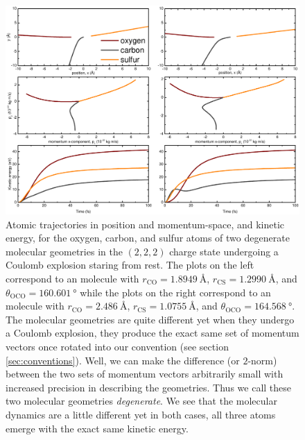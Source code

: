\begin{figure}
  \centering
  \includegraphics[width=\textwidth]{Plots/DegenerateGeometryTrajectories.pdf}
  \caption[Atomic trajectories in position and momentum-space, and kinetic energy, of two degenerate molecular geometries undergoing a Coulomb explosion.]
  {Atomic trajectories in position and momentum-space, and kinetic energy, for the oxygen, carbon, and sulfur atoms of two degenerate  molecular geometries in the $(2,2,2)$ charge state undergoing a Coulomb explosion staring from rest. The plots on the left correspond to an  molecule with $r_\textrm{CO} = \SI{1.8949}{\angstrom}$, $r_\textrm{CS} = \SI{1.2990}{\angstrom}$, and $\theta_\mathrm{OCO} = \SI{160.601}{\degree}$ while the plots on the right correspond to an  molecule with $r_\textrm{CO} = \SI{2.486}{\angstrom}$, $r_\textrm{CS} = \SI{1.0755}{\angstrom}$, and $\theta_\mathrm{OCO} = \SI{164.568}{\degree}$. The molecular geometries are quite different yet when they undergo a Coulomb explosion, they produce the exact same set of momentum vectors once rotated into our convention (see section \ref{sec:conventions}). Well, we can make the difference (or $2$-norm) between the two sets of momentum vectors arbitrarily small with increased precision in describing the geometries. Thus we call these two molecular geometries \emph{degenerate}. We see that the molecular dynamics are a little different yet in both cases, all three atoms emerge with the exact same kinetic energy.}
  \label{fig:DegenerateGeometryTrajectories}
\end{figure}

